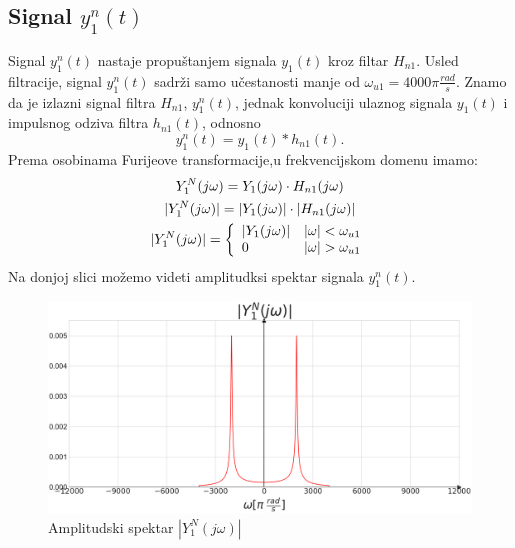 \documentclass[titlepage,a4paper,12pt]{article}
\begin{document}
	\subsection{Signal $y_1^n(t)$}
	Signal $y_1^n(t)$ nastaje propuštanjem signala $y_1(t)$ kroz filtar $H_{n1}$. 
	Usled filtracije, signal $y_1^n(t)$ sadrži samo učestanosti manje od $\omega_{u1} = 4000\pi\frac{rad}{s}$. Znamo da je izlazni signal filtra $H_{n1}$, $y_1^n(t)$, jednak konvoluciji ulaznog signala $y_1(t)$ i impulsnog odziva filtra $h_{n1}(t)$, odnosno
	\begin{equation}
		y_1^n(t) = y_1(t) * h_{n1}(t).
	\end{equation}
	Prema osobinama Furijeove transformacije,u frekvencijskom domenu imamo:
	\begin{gather}
		Y_1^N(j\omega) = Y_1(j\omega)\cdot H_{n1}(j\omega)\\
		|Y_1^N(j\omega)| = |Y_1(j\omega)|\cdot |H_{n1}(j\omega)|\notag\\
		|Y_1^N(j\omega)| = \left\{\begin{array}{lll}
			|Y_1(j\omega)| &|\omega| < \omega_{u1} \\
			0 &|\omega| > \omega_{u1}
		\end{array}\right.
	\end{gather}
	Na donjoj slici možemo videti amplitudksi spektar signala $y_1^n(t)$.
	\begin{figure}[ht]
		\centering
		\includegraphics[width=\textwidth]{Images/AmpY1N.png}
		\caption{Amplitudski spektar $|Y_1^N(j\omega)|$}\label{fig:AmpY1N}
	\end{figure}
	\FloatBarrier
	\clearpage
\end{document}
